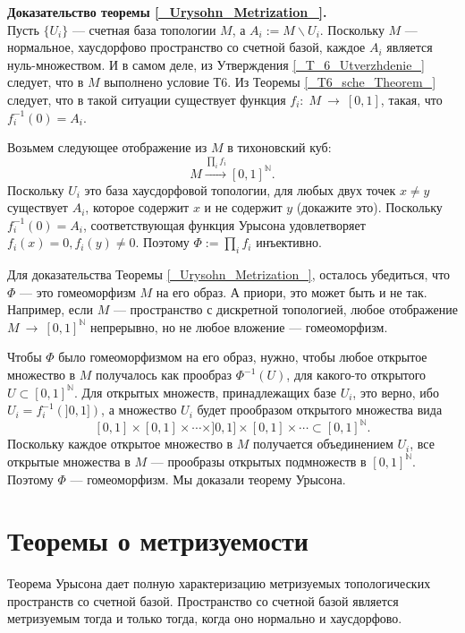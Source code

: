 \documentclass[12pt]{book}
\newcommand{\arrow}{{\:\longrightarrow\:}}
\def\endproof{\hbox{\vrule width 5pt height 5pt depth 0pt}}
\def\N{{\mathbb N}}
\theoremstyle{upshape}
\theoremstyle{generic}
\theoremstyle{upshapenonumber}
\newcommand{\следствие}{%
     \refstepcounter{teorema}
     {\noindent\bf Следствие \thechapter.\arabic{teorema}:\ }}
\newcommand{\пример}{%
     \refstepcounter{teorema}
     {\noindent\bf Пример \thechapter.\arabic{teorema}:\ }}
\newcommand{\лемма}{%
     \refstepcounter{teorema}
     {\noindent\bf Лемма \thechapter.\arabic{teorema}:\ }}
\newcommand{\теорема}{%
     \refstepcounter{teorema}
     {\noindent\bf Теорема \thechapter.\arabic{teorema}:\ }}
\newcommand{\утверждение}{%
     \refstepcounter{teorema}
     {\noindent\bf Утверждение \thechapter.\arabic{teorema}:\ }}
\def\хфилл{\hfill}
\def\бф{\bf}
\begin{document}
\noindent
{\бф Доказательство теоремы \ref{_Urysohn_Metrization_}.}\\
Пусть $\{U_i\}$ --- счетная база топологии $M$, а 
$A_i:= M \backslash U_i$. Поскольку $M$ --- нормальное, 
хаусдорфово пространство со счетной базой, каждое
$A_i$ является нуль-множеством. И в самом деле,
из Утверждения \ref{_T_6_Utverzhdenie_}
следует, что в $M$ выполнено условие Т6.
Из Теоремы \ref{_T6_sche_Theorem_} следует,
что в такой ситуации существует функция
$f_i:\; M \arrow [0,1]$, такая, что $f_i^{-1}(0)=A_i$.

Возьмем следующее отображение из $M$ в тихоновский куб:
\[
M \stackrel{\prod_i f_i}\arrow [0,1]^{\N}.
\]
Поскольку $U_i$ это база хаусдорфовой топологии, 
для любых двух точек $x\neq y$ существует $A_i$, которое содержит 
$x$ и не содержит $y$ (докажите это). Поскольку $f_i^{-1}(0)=A_i$,
соответствующая функция Урысона удовлетворяет
$f_i(x)=0, f_i(y)\neq 0$. Поэтому $\Phi:=\prod_i f_i$ 
инъективно.

Для доказательства Теоремы \ref{_Urysohn_Metrization_},
осталось убедиться, что $\Phi$ --- это гомеоморфизм $M$ на
его образ.  А приори, это может быть и не так. Например,
если $M$ --- пространство с дискретной топологией,
любое отображение $M \arrow [0,1]^{\N}$ непрерывно,
но не любое вложение --- гомеоморфизм.

Чтобы $\Phi$ было гомеоморфизмом на его образ, нужно, чтобы
любое открытое множество в $M$ получалось как прообраз
$\Phi^{-1}(U)$, для какого-то открытого $U\subset [0,1]^{\N}$. 
Для открытых множеств, принадлежащих базе $U_i$, это верно,
ибо $U_i = f_i^{-1}(]0,1])$, а множество $U_i$  будет
прообразом открытого множества вида
\[
[0,1]\times [0,1] \times \cdots \times ]0,1] \times [0,1]\times \cdots \subset [0,1]^{\N}.
\] 
Поскольку каждое открытое множество в $M$ 
получается объединением $U_i$, все открытые множества
в $M$ --- прообразы открытых подмножеств в $[0,1]^{\N}$.
Поэтому $\Phi$ --- гомеоморфизм. Мы доказали теорему Урысона.
\endproof

\хфилл


\section{Теоремы о метризуемости}


Теорема Урысона дает полную характеризацию метризуемых 
топологических пространств со счетной базой. Пространство
со счетной базой является метризуемым тогда и только
тогда, когда оно нормально и хаусдорфово.
\end{document}
